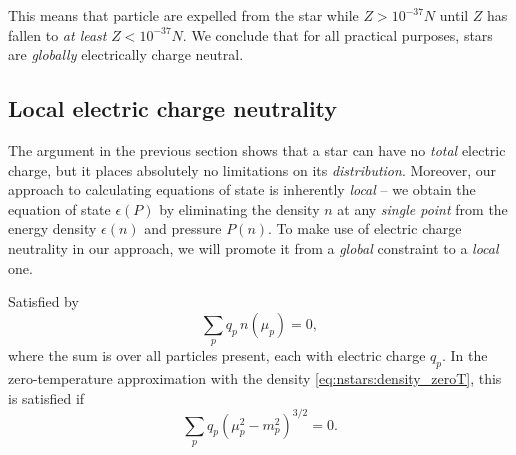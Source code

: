 This means that particle are expelled from the star while $Z > 10^{-37} N$ until $Z$ has fallen to \emph{at least} $Z < 10^{-37} N$.
We conclude that for all practical purposes, stars are \emph{globally} electrically charge neutral.





\subsection{Local electric charge neutrality}



The argument in the previous section shows that a star can have no \emph{total} electric charge, but it places absolutely no limitations on its \emph{distribution}.
Moreover, our approach to calculating equations of state is inherently \emph{local} -- we obtain the equation of state $\epsilon(P)$ by eliminating the density $n$ at any \emph{single point} from the energy density $\epsilon(n)$ and pressure $P(n)$.
To make use of electric charge neutrality in our approach, we will promote it from a \emph{global} constraint to a \emph{local} one.




Satisfied by
\begin{equation}
	\sum_p q_p \, n(\mu_p) = 0 ,
\label{eq:lsm:charge_neutrality}
\end{equation}
where the sum is over all particles present, each with electric charge $q_p$.
In the zero-temperature approximation with the density \eqref{eq:nstars:density_zeroT}, this is satisfied if
\begin{equation}
	\sum_p q_p \left( \mu_p^2 - m_p^2 \right)^{3/2} = 0 .
\end{equation}

